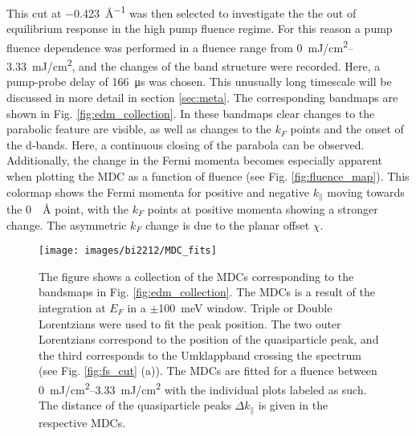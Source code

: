 This cut at \qty{-0.423}{\angstrom^{-1}} was then selected to investigate the the out of equilibrium response in the high pump fluence regime.
For this reason a pump fluence dependence was performed in a fluence range from \qtyrange{0}{3.33}{\milli\joule/\centi\meter\squared}, and the changes of the band structure were recorded.
Here, a pump-probe delay of \qty{166}{\micro\second} was chosen.
This unusually long timescale will be discussed in more detail in section \ref{sec:meta}.
The corresponding bandmaps are shown in Fig. \ref{fig:edm_collection}.
In these bandmaps clear changes to the parabolic feature are visible, as well as changes to the $k_F$ points and the onset of the  d-bands.
Here, a continuous closing of the parabola can be observed.
Additionally, the change in the Fermi momenta becomes especially apparent when plotting the MDC as a function of fluence (see Fig. \ref{fig:fluence_map}).
This colormap shows the Fermi momenta for positive and negative $k_\parallel$ moving towards the \qty{0}{\per\angstrom} point, with the $k_F$ points at positive momenta showing a stronger change.
The asymmetric $k_F$ change is due to the planar offset $\chi$.

\begin{figure}[t]
	\centering
	\texttt{[image: images/bi2212/MDC\_fits]}
	\caption{The figure shows a collection of the MDCs corresponding to the bandsmaps in Fig. \ref{fig:edm_collection}. The MDCs is a result of the integration at $E_F$ in a $\pm$\qty{100}{\milli\electronvolt} window. Triple or Double Lorentzians were used to fit the peak position. The two outer Lorentzians correspond to the position of the quasiparticle peak, and the third corresponds to the Umklappband crossing the spectrum (see Fig. \ref{fig:fs_cut} (a)). The MDCs are fitted for a fluence between \qtyrange{0}{3.33}{\milli\joule/\centi\meter\squared} with the individual plots labeled as such. The distance of the quasiparticle peaks $\Delta k_\parallel$ is given in the respective MDCs.}
	\label{fig:mdc_fits}
\end{figure}

